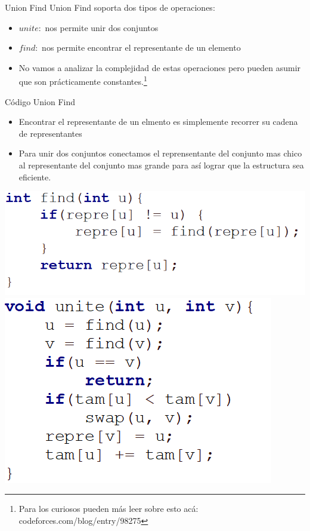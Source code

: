 \documentclass{beamer}
\begin{document}
\begin{frame}{Union Find}
	Union Find soporta dos tipos de operaciones: 
	\begin{itemize}
		\item $unite:$ nos permite unir dos conjuntos
		\item $find:$ nos permite encontrar el representante de un elemento
		\item No vamos a analizar la complejidad de estas operaciones pero pueden asumir que son prácticamente constantes.\footnote{Para los curiosos pueden más leer sobre esto acá: codeforces.com/blog/entry/98275}
	\end{itemize}

\end{frame}

\begin{frame}{Código Union Find}
	\begin{itemize}
		\item Encontrar el representante de un elmento es simplemente recorrer su cadena de representantes
		\item Para unir dos conjuntos conectamos el reprensentante del conjunto mas chico al representante del conjunto mas grande para así lograr que la estructura sea eficiente.
	\end{itemize}
	\includegraphics[scale=0.30]{figuras/codigo-find.PNG}
	\includegraphics[scale=0.40]{figuras/codigo-unite.PNG}
\end{frame}
\end{document}
